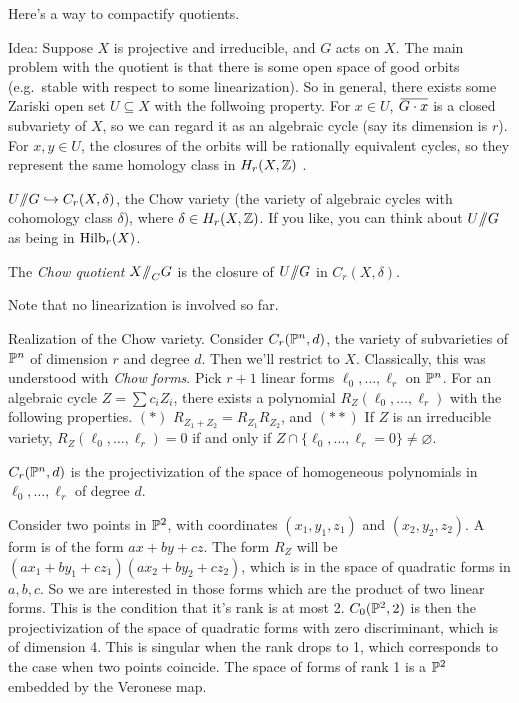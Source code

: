 Here's a way to compactify quotients.

Idea: Suppose $X$ is projective and irreducible, and $G$ acts on $X$. The main problem with the quotient is that there is some open space of good orbits (e.g.~stable with respect to some linearization). So in general, there exists some Zariski open set $U\subseteq X$ with the follwoing property. For $x\in U$, $\bbar{G\cdot x}$ is a closed subvariety of $X$, so we can regard it as an algebraic cycle (say its dimension is $r$). For $x,y\in U$, the closures of the orbits will be rationally equivalent cycles, so they represent the same homology class in $H_r(X,\mathbb{Z})$ .

$U\mbox{\rm /\!\!/} G\hookrightarrow C_r(X,\delta)$, the Chow variety (the variety of algebraic cycles with cohomology class $\delta$), where $\delta\in H_r(X,\mathbb{Z})$. If you like, you can think about $U\mbox{\rm /\!\!/} G$ as being in $\operatorname{Hilb}_r(X)$.
\begin{definition}
 The \emph{Chow quotient} $X\mbox{\rm /\!\!/}_C G$ is the closure of $U\mbox{\rm /\!\!/} G$ in $C_r(X,\delta)$. %
\end{definition}
Note that no linearization is involved so far.

Realization of the Chow variety. Consider $C_r(\mathbb{P}^n,d)$, the variety of subvarieties of $\mathbb{P}^n$ of dimension $r$ and degree $d$. Then we'll restrict to $X$. Classically, this was understood with \emph{Chow forms}. Pick $r+1$ linear forms $\ell_0,\dots, \ell_r$ on $\mathbb{P}^n$. For an algebraic cycle $Z=\sum c_i Z_i$, there exists a polynomial $R_Z(\ell_0,\dots, \ell_r)$ with the following properties. $(*)$ $R_{Z_1+Z_2}=R_{Z_1}R_{Z_2}$, and $(**)$ If $Z$ is an irreducible variety, $R_Z(\ell_0,\dots, \ell_r)=0$ if and only if $Z\cap \{\ell_0,\dots, \ell_r=0\}\neq\varnothing$.

$C_r(\mathbb{P}^n,d)$ is the projectivization of the space of homogeneous polynomials in $\ell_0,\dots, \ell_r$ of degree $d$.

\begin{example}
 Consider two points in $\mathbb{P}^2$, with coordinates $(x_1,y_1,z_1)$ and $(x_2,y_2,z_2)$. A form is of the form $ax+by+cz$. The form $R_Z$ will be $(ax_1+by_1+cz_1)(ax_2+by_2+cz_2)$, which is in the space of quadratic forms in $a,b,c$. So we are interested in those forms which are the product of two linear forms. This is the condition that it's rank is at most 2. $C_0(\mathbb{P}^2,2)$ is then the projectivization of the space of quadratic forms with zero discriminant, which is of dimension 4. This is singular when the rank drops to 1, which corresponds to the case when two points coincide. The space of forms of rank 1 is a $\mathbb{P}^2$ embedded by the Veronese map.
\end{example}

